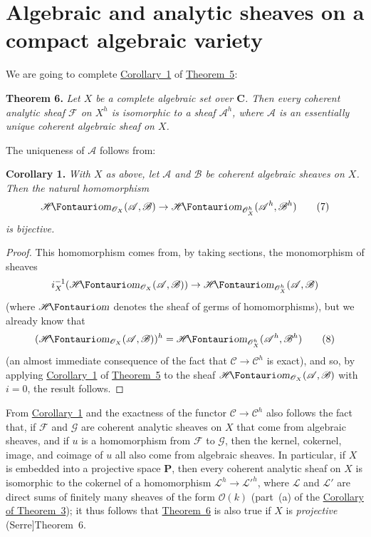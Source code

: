 \documentclass{article}
\newenvironment{itenv}[1]
  {\smallskip\noindent\textbf{#1.}\itshape}
  {\smallskip}
\newcommand{\scr}[1]{{\mathscr{#1}}}
\renewcommand{\cal}[1]{{\mathcal{#1}}}
\newcommand{\shHom}{\scr{H}\textup{\kern-2.2pt{\Fontauri\slshape om}}}
\newcommand{\oldpage}[1]{\marginpar{\footnotesize$\Big\vert$ \textit{p.~#1}}}
\begin{document}
\section{Algebraic and analytic sheaves on a compact algebraic variety}
\label{section8}

We are going to complete \hyperref[corollary1-5]{Corollary~1} of \hyperref[theorem5]{Theorem~5}:

\begin{itenv}{Theorem 6}
\label{theorem6}
  Let $X$ be a complete algebraic set over $\mathbf{C}$.
  Then every coherent analytic sheaf $\scr{F}$ on $X^h$ is isomorphic to a sheaf $\scr{A}^h$, where $\scr{A}$ is an essentially unique coherent algebraic sheaf on $X$.
\end{itenv}

The uniqueness of $\scr{A}$ follows from:

\begin{itenv}{Corollary 1}
\label{corollary1-6}
  With $X$ as above, let $\scr{A}$ and $\scr{B}$ be coherent algebraic sheaves on $X$.
  Then the natural homomorphism
  \[
  \label{equation7}
    \shHom_{\scr{O}_X}(\scr{A},\scr{B}) \to \shHom_{\scr{O}_X^h}(\scr{A}^h,\scr{B}^h)
    \tag{7}
  \]
  is bijective.
\end{itenv}

\begin{proof}
  This homomorphism comes from, by taking sections, the monomorphism of sheaves
  \[
    i_X^{-1}(\shHom_{\scr{O}_X}(\scr{A},\scr{B})) \to \shHom_{\scr{O}_X^h}(\scr{A},\scr{B})
  \]
  (where $\shHom$ denotes the sheaf of germs of homomorphisms), but we already know that
  \[
  \label{equation8}
    (\shHom_{\scr{O}_X}(\scr{A},\scr{B}))^h = \shHom_{\scr{O}_X^h}(\scr{A}^h,\scr{B}^h)
    \tag{8}
  \]
  (an almost immediate consequence of the fact that $\cal{C}\to\cal{C}^h$ is exact), and so, by applying \hyperref[corollary1-5]{Corollary~1} of \hyperref[theorem5]{Theorem~5} to the sheaf $\shHom_{\scr{O}_X}(\scr{A},\scr{B})$ with $i=0$, the result follows.
\end{proof}

From \hyperref[corollary1-6]{Corollary~1} and the exactness of the functor $\cal{C}\to\cal{C}^h$ also follows the fact that, if $\scr{F}$ and $\scr{G}$ are coherent analytic sheaves on $X$ that come from algebraic sheaves, and if $u$ is a homomorphism from $\scr{F}$ to $\scr{G}$, then the kernel, cokernel, image, and coimage of $u$ all also come
\oldpage{2-15}
from algebraic sheaves.
In particular, if $X$ is embedded into a projective space $\mathbf{P}$, then every coherent analytic sheaf on $X$ is isomorphic to the cokernel of a homomorphism $\scr{L}^h\to\scr{L}'^h$, where $\scr{L}$ and $\scr{L}'$ are direct sums of finitely many sheaves of the form $\scr{O}(k)$ (part~(a) of the \hyperref[corollary-3]{Corollary of Theorem~3});
it thus follows that \hyperref[theorem6]{Theorem~6} is also true if $X$ is \emph{projective} (Serre]{Theorem~6}.
\end{document}
